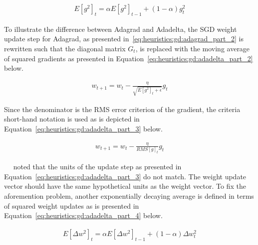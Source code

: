 \begin{equation}
      \label{eq:heuristics:gd:adadelta_part_1}
      \begin{split}
            E[g^{2}]_{t} = \alpha E[g^{2}]_{t - 1} + (1 - \alpha)g_{t}^{2}
      \end{split}
\end{equation}

\noindent
To illustrate the difference between \acs{Adagrad} and \acs{Adadelta}, the \acs{SGD} weight update step for \acs{Adagrad}, as presented in~\eqref{eq:heuristics:gd:adagrad_part_2} is rewritten such that the diagonal matrix $G_{t}$, is replaced with the moving average of squared gradients as presented in Equation~\eqref{eq:heuristics:gd:adadelta_part_2} below.

\begin{equation}
      \label{eq:heuristics:gd:adadelta_part_2}
      \begin{split}
            w_{t+1} = w_{t} - \frac{\eta}{\sqrt{E[g^{2}]_{t} + \epsilon}} g_{t}
      \end{split}
\end{equation}

\noindent
Since the denominator is the \acf{RMS} error criterion of the gradient, the criteria short-hand notation is used as is depicted in Equation~\eqref{eq:heuristics:gd:adadelta_part_3} below.

\begin{equation}
      \label{eq:heuristics:gd:adadelta_part_3}
      \begin{split}
            w_{t+1} = w_{t} - \frac{\eta}{RMS[g]_{t}} g_{t}
      \end{split}
\end{equation}

\noindent
~\citeauthor{ref:zeiler:2012}~\cite{ref:zeiler:2012} noted that the units of the update step as presented in Equation~\eqref{eq:heuristics:gd:adadelta_part_3} do not match. The weight update vector should have the same hypothetical units as the weight vector. To fix the aforemention problem, another exponentially decaying average is defined in terms of squared weight updates as is presented in Equation~\eqref{eq:heuristics:gd:adadelta_part_4} below.

\begin{equation}
      \label{eq:heuristics:gd:adadelta_part_4}
      \begin{split}
            E[\Delta w^{2}]_{t} = \alpha E[\Delta w^{2}]_{t - 1} + (1 - \alpha)\Delta w_{t}^{2}
      \end{split}
\end{equation}

